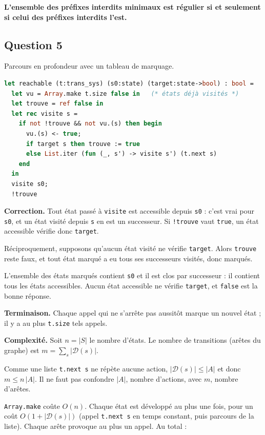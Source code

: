 \documentclass[11pt,a4paper]{article}
\begin{document}
\textbf{L'ensemble des préfixes interdits minimaux est régulier si et seulement si celui des préfixes interdits l'est.}

\hypertarget{question-5}{%
\subsection{Question 5}\label{question-5}}

Parcours en profondeur avec un tableau de marquage.

\begin{lstlisting}[language=Caml]
let reachable (t:trans_sys) (s0:state) (target:state->bool) : bool =
  let vu = Array.make t.size false in   (* états déjà visités *)
  let trouve = ref false in
  let rec visite s =
    if not !trouve && not vu.(s) then begin
      vu.(s) <- true;
      if target s then trouve := true
      else List.iter (fun (_, s') -> visite s') (t.next s)
    end
  in
  visite s0;
  !trouve
\end{lstlisting}

\textbf{Correction.} Tout état passé à \texttt{visite} est accessible depuis \texttt{s0} : c'est vrai pour \texttt{s0}, et un état visité depuis \texttt{s} en est un successeur. Si \texttt{!trouve} vaut \texttt{true}, un état accessible vérifie donc \texttt{target}.

Réciproquement, supposons qu'aucun état visité ne vérifie \texttt{target}. Alors \texttt{trouve} reste faux, et tout état marqué a eu tous ses successeurs visités, donc marqués.

L'ensemble des états marqués contient \texttt{s0} et il est clos par successeur : il contient tous les états accessibles. Aucun état accessible ne vérifie \texttt{target}, et \texttt{false} est la bonne réponse.

\textbf{Terminaison.} Chaque appel qui ne s'arrête pas aussitôt marque un nouvel état ; il y a au plus \texttt{t.size} tels appels.

\textbf{Complexité.} Soit \(n=|S|\) le nombre d'états. Le nombre de transitions (arêtes du graphe) est \(m=\sum_s|\mathcal D(s)|\).

Comme une liste \texttt{t.next\ s} ne répète aucune action, \(|\mathcal D(s)|\le|A|\) et donc \(m\le n\,|A|\). Il ne faut pas confondre \(|A|\), nombre d'actions, avec \(m\), nombre d'arêtes.

\texttt{Array.make} coûte \(O(n)\). Chaque état est développé au plus une fois, pour un coût \(O(1+|\mathcal D(s)|)\) (appel \texttt{t.next\ s} en temps constant, puis parcours de la liste). Chaque arête provoque au plus un appel. Au total :
\end{document}

